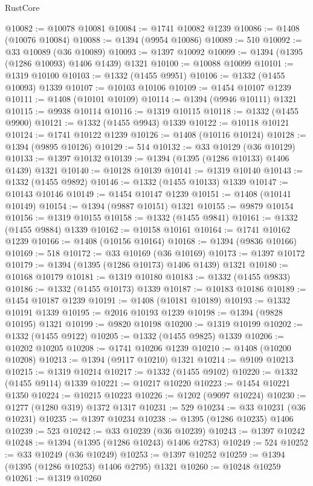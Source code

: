 \begin{lexlean}{RustCore}
\begin{coremodule}
@10082 := @10078 @10081
@10084 := @1741 @10082 @1239
@10086 := @1408 (@10076 @10084)
@10088 := @1394 (@9954 @10086)
@10089 := 510
@10092 := @33 @10089 (@36 @10089)
@10093 := @1397 @10092
@10099 := @1394 (@1395 (@1286 @10093) @1406 @1439) @1321
@10100 := @10088 @10099
@10101 := @1319 @10100
@10103 := @1332 (@1455 @9951)
@10106 := @1332 (@1455 @10093) @1339
@10107 := @10103 @10106
@10109 := @1454 @10107 @1239
@10111 := @1408 (@10101 @10109)
@10114 := @1394 (@9946 @10111) @1321
@10115 := @9938 @10114
@10116 := @1319 @10115
@10118 := @1332 (@1455 @9900)
@10121 := @1332 (@1455 @9943) @1339
@10122 := @10118 @10121
@10124 := @1741 @10122 @1239
@10126 := @1408 (@10116 @10124)
@10128 := @1394 (@9895 @10126)
@10129 := 514
@10132 := @33 @10129 (@36 @10129)
@10133 := @1397 @10132
@10139 := @1394 (@1395 (@1286 @10133) @1406 @1439) @1321
@10140 := @10128 @10139
@10141 := @1319 @10140
@10143 := @1332 (@1455 @9892)
@10146 := @1332 (@1455 @10133) @1339
@10147 := @10143 @10146
@10149 := @1454 @10147 @1239
@10151 := @1408 (@10141 @10149)
@10154 := @1394 (@9887 @10151) @1321
@10155 := @9879 @10154
@10156 := @1319 @10155
@10158 := @1332 (@1455 @9841)
@10161 := @1332 (@1455 @9884) @1339
@10162 := @10158 @10161
@10164 := @1741 @10162 @1239
@10166 := @1408 (@10156 @10164)
@10168 := @1394 (@9836 @10166)
@10169 := 518
@10172 := @33 @10169 (@36 @10169)
@10173 := @1397 @10172
@10179 := @1394 (@1395 (@1286 @10173) @1406 @1439) @1321
@10180 := @10168 @10179
@10181 := @1319 @10180
@10183 := @1332 (@1455 @9833)
@10186 := @1332 (@1455 @10173) @1339
@10187 := @10183 @10186
@10189 := @1454 @10187 @1239
@10191 := @1408 (@10181 @10189)
@10193 := @1332 @10191 @1339
@10195 := @2016 @10193 @1239
@10198 := @1394 (@9828 @10195) @1321
@10199 := @9820 @10198
@10200 := @1319 @10199
@10202 := @1332 (@1455 @9122)
@10205 := @1332 (@1455 @9825) @1339
@10206 := @10202 @10205
@10208 := @1741 @10206 @1239
@10210 := @1408 (@10200 @10208)
@10213 := @1394 (@9117 @10210) @1321
@10214 := @9109 @10213
@10215 := @1319 @10214
@10217 := @1332 (@1455 @9102)
@10220 := @1332 (@1455 @9114) @1339
@10221 := @10217 @10220
@10223 := @1454 @10221 @1350
@10224 := @10215 @10223
@10226 := @1202 (@9097 @10224)
@10230 := @1277 (@1280 @319) @1372 @1317
@10231 := 529
@10234 := @33 @10231 (@36 @10231)
@10235 := @1397 @10234
@10238 := @1395 (@1286 @10235) @1406
@10239 := 523
@10242 := @33 @10239 (@36 @10239)
@10243 := @1397 @10242
@10248 := @1394 (@1395 (@1286 @10243) @1406 @2783)
@10249 := 524
@10252 := @33 @10249 (@36 @10249)
@10253 := @1397 @10252
@10259 := @1394 (@1395 (@1286 @10253) @1406 @2795) @1321
@10260 := @10248 @10259
@10261 := @1319 @10260

\end{coremodule}
\end{lexlean}
